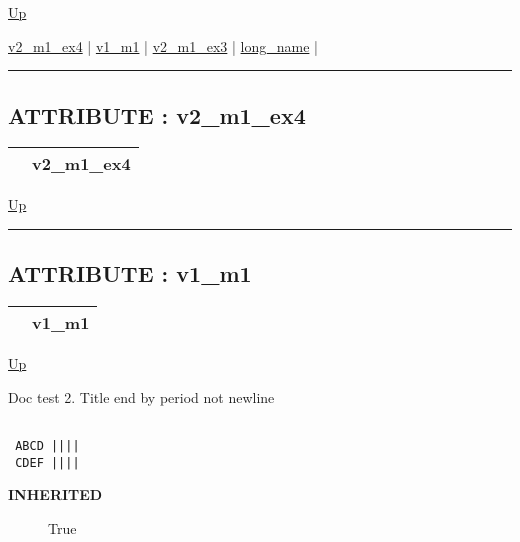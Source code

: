 \hyperlink{ecldoc:intest.inintest.example_4}{Up}

\par


\hyperlink{ecldoc:intest.inintest.example_4.mod_1.v2_m1_ex4}{v2\_m1\_ex4}  |
\hyperlink{ecldoc:example_3.mod_1.v1_m1}{v1\_m1}  |
\hyperlink{ecldoc:example_3.mod_1.v2_m1_ex3}{v2\_m1\_ex3}  |
\hyperlink{ecldoc:example_3.mod_1.long_name}{long\_name}  |

\rule{\textwidth}{0.4pt}

\subsection*{ATTRIBUTE : v2\_m1\_ex4}
\hypertarget{ecldoc:intest.inintest.example_4.mod_1.v2_m1_ex4}{}

{\renewcommand{\arraystretch}{1.5}
\begin{tabularx}{\textwidth}{|>{\raggedright\arraybackslash}l|X|}
\hline
\hspace{0pt} & v2\_m1\_ex4 \\
\hline
\end{tabularx}
}

\hyperlink{ecldoc:intest.inintest.example_4.mod_1}{Up}

\par


\rule{\textwidth}{0.4pt}
\subsection*{ATTRIBUTE : v1\_m1}
\hypertarget{ecldoc:example_3.mod_1.v1_m1}{}

{\renewcommand{\arraystretch}{1.5}
\begin{tabularx}{\textwidth}{|>{\raggedright\arraybackslash}l|X|}
\hline
\hspace{0pt} & v1\_m1 \\
\hline
\end{tabularx}
}

\hyperlink{ecldoc:intest.inintest.example_4.mod_1}{Up}

\par
Doc test 2. Title end by period not newline 
\begin{verbatim}

 ABCD ||||
 CDEF ||||\end{verbatim}



\par
\begin{description}
\item [\textbf{INHERITED}] True
\end{description}

